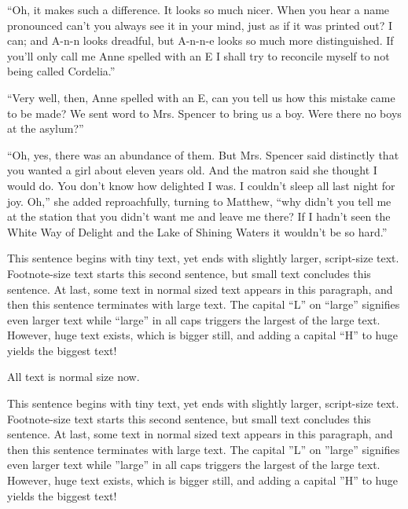 \documentclass[a4paper]{article}
\begin{document}
``Oh, it makes such a difference. It looks so much nicer. When you hear a name pronounced can't you always see it in your mind, just as if it was printed out? I can; and A-n-n looks dreadful, but A-n-n-e looks so much more distinguished. If you'll only call me Anne spelled with an E I shall try to reconcile myself to not being called Cordelia.''

``Very well, then, Anne spelled with an E, can you tell us how this mistake came to be made? We sent word to Mrs. Spencer to bring us a boy. Were there no boys at the asylum?''

``Oh, yes, there was an abundance of them. But Mrs. Spencer said distinctly that you wanted a girl about eleven years old. And the matron said she thought I would do. You don't know how delighted I was. I couldn't sleep all last night for joy. Oh,'' she added reproachfully, turning to Matthew, ``why didn't you tell me at the station that you didn't want me and leave me there? If I hadn't seen the White Way of Delight and the Lake of Shining Waters it wouldn't be so hard.''

\tiny This sentence begins with tiny text, \scriptsize yet ends with slightly larger, script-size text. \footnotesize Footnote-size text starts this second sentence, \small but small text concludes this sentence. \normalsize At last, some text in normal sized text appears in this paragraph, \large and then this sentence terminates with large text. \Large The capital ``L'' on ``large'' signifies even larger text \LARGE while ``large'' in all caps triggers the largest of the large text. \huge However, huge text exists, which is bigger still, \Huge and adding a capital ``H'' to huge yields the biggest text!

\normalsize{All text is normal size now.}

{\tiny This sentence begins with tiny text, \scriptsize yet ends with slightly larger, script-size text. \footnotesize Footnote-size text starts this second sentence, \small but small text concludes this sentence. \normalsize At last, some text in normal sized text appears in this paragraph, \large and then this sentence terminates with large text. \Large The capital ''L'' on ''large'' signifies even larger text \LARGE while ''large'' in all caps triggers the largest of the large text. \huge However, huge text exists, which is bigger still, \Huge and adding a capital ''H'' to huge yields the biggest text!}
\end{document}
